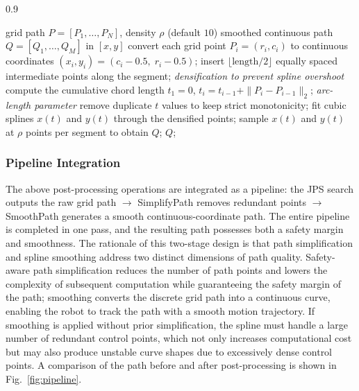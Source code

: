 \documentclass[lettersize,journal]{IEEEtran}
\begin{document}
\begin{algorithm}[!t]
\caption{Arc-length parameterized cubic spline smoothing}
\label{alg:smooth}
\begin{spacing}{0.9}
\begin{algorithmic}[1]
\REQUIRE grid path $P = [P_1, \ldots, P_N]$, density $\rho$ (default $10$)
\ENSURE smoothed continuous path $Q = [Q_1, \ldots, Q_M]$ in $[x, y]$
\STATE convert each grid point $P_i = (r_i, c_i)$ to continuous coordinates $(x_i, y_i) = (c_i - 0.5,\; r_i - 0.5)$;
\STATE insert $\lfloor \mathrm{length} / 2 \rfloor$ equally spaced intermediate points along the segment; \quad\textit{densification to prevent spline overshoot}
\ENDFOR
\STATE compute the cumulative chord length $t_1 = 0$, $t_i = t_{i-1} + \|P_i - P_{i-1}\|_2$; \quad\textit{arc-length parameter}
\STATE remove duplicate $t$ values to keep strict monotonicity;
\STATE fit cubic splines $x(t)$ and $y(t)$ through the densified points;
\STATE sample $x(t)$ and $y(t)$ at $\rho$ points per segment to obtain $Q$;
\RETURN $Q$;
\end{algorithmic}
\end{spacing}
\end{algorithm}

\subsubsection{Pipeline Integration}

The above post-processing operations are integrated as a pipeline: the JPS search outputs the raw grid path $\to$ SimplifyPath removes redundant points $\to$ SmoothPath generates a smooth continuous-coordinate path. The entire pipeline is completed in one pass, and the resulting path possesses both a safety margin and smoothness. The rationale of this two-stage design is that path simplification and spline smoothing address two distinct dimensions of path quality. Safety-aware path simplification reduces the number of path points and lowers the complexity of subsequent computation while guaranteeing the safety margin of the path; smoothing converts the discrete grid path into a continuous curve, enabling the robot to track the path with a smooth motion trajectory. If smoothing is applied without prior simplification, the spline must handle a large number of redundant control points, which not only increases computational cost but may also produce unstable curve shapes due to excessively dense control points. A comparison of the path before and after post-processing is shown in Fig.~\textcolor{blue}{\ref{fig:pipeline}}.
\end{document}
